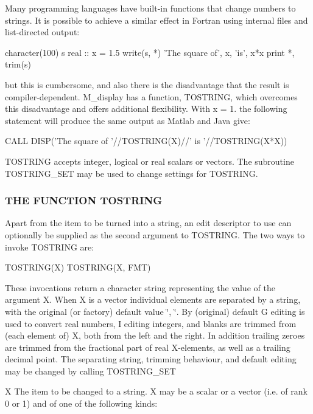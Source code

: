 Many programming languages have built-\/in functions that change numbers to strings. It is possible to achieve a similar effect in Fortran using internal files and list-\/directed output\+: \begin{DoxyVerb}  character(100) s
  real :: x = 1.5
  write(s, *) 'The square of', x, 'is', x*x
  print *, trim(s)
\end{DoxyVerb}


but this is cumbersome, and also there is the disadvantage that the result is compiler-\/dependent. M\+\_\+display has a function, T\+O\+S\+T\+R\+I\+NG, which overcomes this disadvantage and offers additional flexibility. With x = 1. the following statement will produce the same output as Matlab and Java give\+: \begin{DoxyVerb}  CALL DISP('The square of '//TOSTRING(X)//' is '//TOSTRING(X*X))
\end{DoxyVerb}


T\+O\+S\+T\+R\+I\+NG accepts integer, logical or real scalars or vectors. The subroutine T\+O\+S\+T\+R\+I\+N\+G\+\_\+\+S\+ET may be used to change settings for T\+O\+S\+T\+R\+I\+NG.

\subsubsection*{T\+HE F\+U\+N\+C\+T\+I\+ON T\+O\+S\+T\+R\+I\+NG}

Apart from the item to be turned into a string, an edit descriptor to use can optionally be supplied as the second argument to T\+O\+S\+T\+R\+I\+NG. The two ways to invoke T\+O\+S\+T\+R\+I\+NG are\+: \begin{DoxyVerb}  TOSTRING(X)
  TOSTRING(X, FMT)
\end{DoxyVerb}


These invocations return a character string representing the value of the argument X. When X is a vector individual elements are separated by a string, with the original (or factory) default value \char`\"{}, \char`\"{}. By (original) default G editing is used to convert real numbers, I editing integers, and blanks are trimmed from (each element of) X, both from the left and the right. In addition trailing zeroes are trimmed from the fractional part of real X-\/elements, as well as a trailing decimal point. The separating string, trimming behaviour, and default editing may be changed by calling T\+O\+S\+T\+R\+I\+N\+G\+\_\+\+S\+ET

X The item to be changed to a string. X may be a scalar or a vector (i.\+e. of rank 0 or 1) and of one of the following kinds\+:

